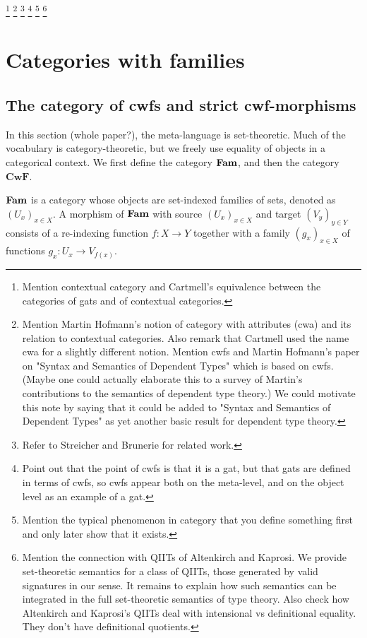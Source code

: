 \documentclass{lmcs}
\def\Cwf{\mathbf{CwF}}
\begin{document}
\footnote{
Mention contextual category and Cartmell's equivalence between the categories of gats and of contextual categories. 
}
\footnote
{Mention Martin Hofmann's notion of category with attributes (cwa) and its relation to contextual categories. Also remark that Cartmell used the name cwa for a slightly different notion. Mention cwfs and Martin Hofmann's paper on "Syntax and Semantics of Dependent Types" which is based on cwfs. (Maybe one could actually elaborate this to a survey of Martin's contributions to the semantics of dependent type theory.) We could motivate this note by saying that it could be added to "Syntax and Semantics of Dependent Types" as yet another basic result for dependent type theory.
}
\footnote
{Refer to Streicher and Brunerie for related work.}
\footnote
{Point out that the point of cwfs is that it is a gat, but that gats are defined in terms of cwfs, so cwfs appear both on the meta-level, and on the object level as an example of a gat.}
\footnote
{Mention the typical phenomenon in category that you define something first and only later show that it exists.}
\footnote
{Mention the connection with QIITs of Altenkirch and Kaprosi. We provide set-theoretic semantics for a class of QIITs, those generated by valid signatures in our sense. It remains to explain how such semantics can be integrated in the full set-theoretic semantics of type theory. Also check how Altenkirch and Kaprosi's QIITs deal with intensional vs definitional equality. They don't have definitional quotients.}

\section{Categories with families}\label{sec:def_cwf}

\subsection{The category of cwfs and strict cwf-morphisms}

In this section (whole paper?), the meta-language is set-theoretic.
Much of the vocabulary is category-theoretic, but we freely use
equality of objects in a categorical context.
We first define the category $\textbf{Fam}$, and then the category $\Cwf$.

\begin{definition}\label{def:catFam}
$\textbf{Fam}$ is a category whose objects are
set-indexed families of sets, denoted as $(U_x)_{x\in X}$.
A morphism of $\textbf{Fam}$ with source $(U_x)_{x\in X}$ and target $(V_y)_{y\in Y}$
consists of a re-indexing function $f: X\to Y$ together with a family
$(g_x)_{x\in X}$ of functions $g_x : U_x \to V_{f(x)}$. %
\end{definition}
\end{document}
